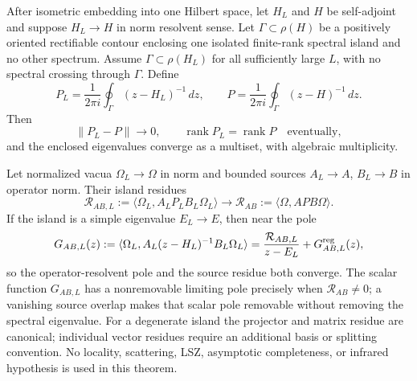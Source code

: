 \documentclass[12pt,a4paper]{article}
\begin{document}
\begin{theorem}
\label{p11:thm:admissible-refinement-stability-finite-readouts}
After isometric embedding into one Hilbert space, let \(H_L\) and \(H\) be
self-adjoint and suppose \(H_L\to H\) in norm resolvent sense.  Let
\(\Gamma\subset\rho(H)\) be a positively oriented rectifiable contour enclosing
one isolated finite-rank spectral island and no other spectrum.  Assume
\(\Gamma\subset\rho(H_L)\) for all sufficiently large \(L\), with no spectral
crossing through \(\Gamma\).  Define
\begin{equation}
\label{p11:eq:refinement-riesz-projectors}
P_L=\frac{1}{2\pi i}\oint_\Gamma(z-H_L)^{-1}\,dz,
\qquad
P=\frac{1}{2\pi i}\oint_\Gamma(z-H)^{-1}\,dz .
\end{equation}
Then
\begin{equation}
\label{p11:eq:refinement-projector-convergence}
\|P_L-P\|\longrightarrow0,
\qquad
\operatorname{rank}P_L=\operatorname{rank}P
\quad\text{eventually},
\end{equation}
and the enclosed eigenvalues converge as a multiset, with algebraic
multiplicity.

Let normalized vacua \(\Omega_L\to\Omega\) in norm and bounded sources
\(A_L\to A\), \(B_L\to B\) in operator norm.  Their island residues
\begin{equation}
\label{p11:eq:refinement-source-residue-limit}
\mathcal R_{AB,L}:=
\langle\Omega_L,A_LP_LB_L\Omega_L\rangle
\longrightarrow
\mathcal R_{AB}:=
\langle\Omega,APB\Omega\rangle .
\end{equation}
If the island is a simple eigenvalue \(E_L\to E\), then near the pole
\begin{equation}
\label{p11:eq:simple-resolvent-pole-decomposition}
G_{AB,L}(z):=
\langle\Omega_L,A_L(z-H_L)^{-1}B_L\Omega_L\rangle
=\frac{\mathcal R_{AB,L}}{z-E_L}+G^{\rm reg}_{AB,L}(z),
\end{equation}
so the operator-resolvent pole and the source residue both converge.  The
scalar function \(G_{AB,L}\) has a nonremovable limiting pole precisely when
\(\mathcal R_{AB}\ne0\); a vanishing source overlap makes that scalar pole
removable without removing the spectral eigenvalue.  For a degenerate island
the projector and matrix residue are canonical; individual vector residues
require an additional basis or splitting convention.  No locality,
scattering, LSZ, asymptotic completeness, or infrared hypothesis is used in
this theorem.
\label{p11:eq:refinement-transfer-convergence}
\label{p11:eq:refinement-operator-convergence}
\label{p11:eq:refinement-uniform-gap-floor}
\label{p11:eq:refinement-gap-liminf}
\end{theorem}
\end{document}
